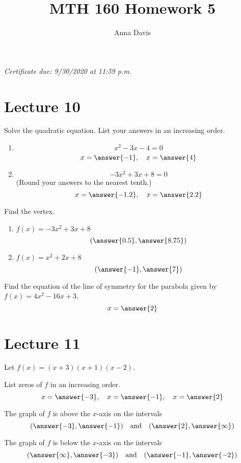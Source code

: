 \documentclass{ximera}
\author{Anna Davis} \title{MTH 160 Homework 5}
\begin{document}
\begin{abstract}

\end{abstract}
\maketitle
 \textit{Certificate due: 9/30/2020 at 11:59 p.m.}
 \section{Lecture 10}
 
  \begin{problem}\label{prob:160hom5prob1} 
  Solve the quadratic equation.  List your answers in an increasing order.
  \begin{enumerate}
      \item $$x^2-3x-4=0$$
      $$x=\answer{-1},\quad x=\answer{4}$$
      \item $$-3x^2+3x+8=0$$ (Round your answers to the nearest tenth.)
      $$x=\answer{-1.2},\quad x=\answer{2.2}$$
  \end{enumerate}
  \end{problem}
  
  \begin{problem}\label{prob:160hom5prob2} 
  Find the vertex.
  \begin{enumerate}
      \item $f(x)=-3x^2+3x+8$
      $$(\answer{0.5},\answer{8.75})$$
      \item $f(x)=x^2+2x+8$
      $$(\answer{-1},\answer{7})$$
  \end{enumerate}
  \end{problem}
  
  \begin{problem}\label{prob:160hom5prob3} 
  Find the equation of the line of symmetry for the parabola given by $f(x)=4x^2-16x+3$.
  $$x=\answer{2}$$
  \end{problem}
  
  \section{Lecture 11}
  
  \begin{problem}\label{prob:160hom5prob5} 
  Let $f(x)=(x+3)(x+1)(x-2)$.  
  
  List zeros of $f$ in an increasing order.
  $$x=\answer{-3},\quad x=\answer{-1},\quad x=\answer{2}$$
  
  The graph of $f$ is above the $x$-axis on the intervals
  $$(\answer{-3},\answer{-1})\quad \mbox{and}\quad (\answer{2},\answer{\infty})$$
  
  The graph of $f$ is below the $x$-axis on the intervals
  $$(\answer{\infty},\answer{-3})\quad \mbox{and}\quad (\answer{-1},\answer{-2})$$
  \end{problem}
  
\end{document}
